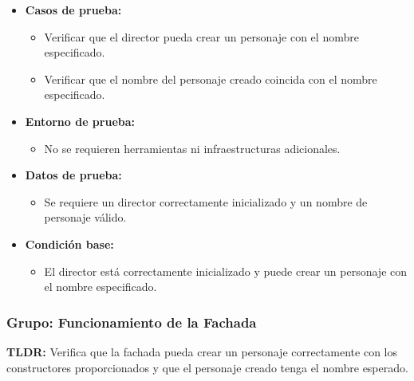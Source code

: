 \documentclass{article}
\begin{document}
\begin{itemize}
	\item \textbf{Casos de prueba:}
	\begin{itemize}
		\item Verificar que el director pueda crear un personaje con el nombre especificado.
		\item Verificar que el nombre del personaje creado coincida con el nombre especificado.
	\end{itemize}
	
	\item \textbf{Entorno de prueba:}
	\begin{itemize}
		\item No se requieren herramientas ni infraestructuras adicionales.
	\end{itemize}
	
	\item \textbf{Datos de prueba:}
	\begin{itemize}
		\item Se requiere un director correctamente inicializado y un nombre de personaje válido.
	\end{itemize}
	
	\item \textbf{Condición base:}
	\begin{itemize}
		\item El director está correctamente inicializado y puede crear un personaje con el nombre especificado.
	\end{itemize}
\end{itemize}



\subsubsection{Grupo: Funcionamiento de la Fachada}
\textbf{TLDR:} Verifica que la fachada pueda crear un personaje correctamente con los constructores proporcionados y que el personaje creado tenga el nombre esperado.
\end{document}
